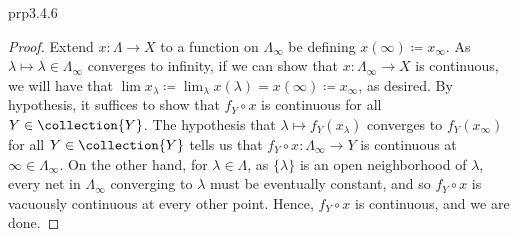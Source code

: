\begin{prp}{}{prp3.4.6}
\begin{proof}
Extend $x\colon \Lambda \rightarrow X$ to a function on $\Lambda _{\infty}$ be defining $x(\infty )\coloneqq x_{\infty}$.  As $\lambda \mapsto \lambda \in \Lambda _{\infty}$ converges to infinity, if we can show that $x\colon \Lambda _{\infty}\rightarrow X$ is continuous, we will have that $\lim x_{\lambda}\coloneqq \lim _{\lambda}x(\lambda )=x(\infty )\coloneqq x_{\infty}$, as desired.  By hypothesis, it suffices to show that $f_Y\circ x$ is continuous for all $Y\in \collection{Y}$.  The hypothesis that $\lambda \mapsto f_Y(x_{\lambda})$ converges to $f_Y(x_{\infty})$ for all $Y\in \collection{Y}$ tells us that $f_Y\circ x\colon \Lambda _{\infty}\rightarrow Y$ is continuous at $\infty \in \Lambda _{\infty}$.  On the other hand, for $\lambda \in \Lambda$, as $\{ \lambda \}$ is an open neighborhood of $\lambda$, every net in $\Lambda _{\infty}$ converging to $\lambda$ must be eventually constant, and so $f_Y\circ x$ is vacuously continuous at every other point.  Hence, $f_Y\circ x$ is continuous, and we are done.
\end{proof}
\end{prp}

